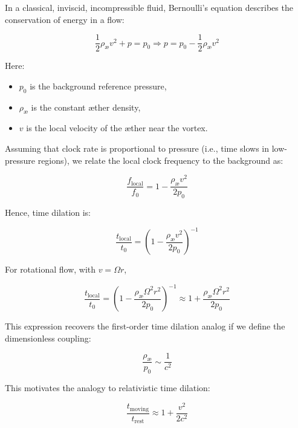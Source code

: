 In a classical, inviscid, incompressible fluid, Bernoulli's equation describes the conservation of energy in a flow:

\begin{equation}
    \frac{1}{2} \rho_{\text{\ae}}  v^2 + p = p_0 \Rightarrow p = p_0 - \frac{1}{2} \rho_{\text{\ae}} v^2
\end{equation}

Here:
\begin{itemize}
    \item $p_0$ is the background reference pressure,
    \item $\rho_{\text{\ae}}$ is the constant æther density,
    \item $v$ is the local velocity of the æther near the vortex.
\end{itemize}

Assuming that clock rate is proportional to pressure (i.e., time slows in low-pressure regions), we relate the local clock frequency to the background as:

\begin{equation}
\frac{f_{\text{local}}}{f_0} = 1 - \frac{\rho_{\text{\ae}} v^2}{2 p_0}
\end{equation}

Hence, time dilation is:

\begin{equation}
    \frac{t_{\text{local}}}{t_0} = \left(1 - \frac{\rho_{\text{\ae}} v^2}{2 p_0}\right)^{-1}
\end{equation}

For rotational flow, with $v = \Omega r$,

\begin{equation}
    \frac{t_{\text{local}}}{t_0} = \left(1 - \frac{\rho_{\text{\ae}} \Omega^2 r^2}{2 p_0} \right)^{-1} \approx 1 + \frac{\rho_{\text{\ae}}\Omega^2 r^2}{2 p_0}
\end{equation}

This expression recovers the first-order time dilation analog if we define the dimensionless coupling:

\begin{equation}
    \frac{\rho_{\text{\ae}}}{p_0} \sim \frac{1}{c^2}
\end{equation}

This motivates the analogy to relativistic time dilation:

\begin{equation}
    \frac{t_{\text{moving}}}{t_\text{rest}} \approx 1 + \frac{v^2}{2 c^2}
\end{equation}

